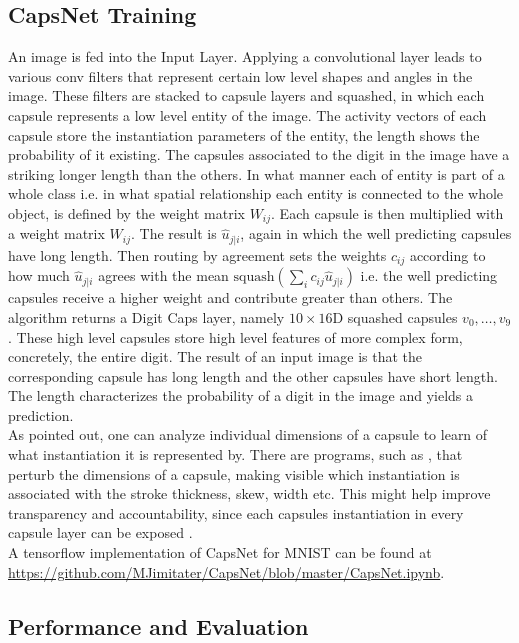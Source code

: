 \documentclass{article}
\begin{document}
{\subsection{CapsNet Training}

An image is fed into the Input Layer. Applying a convolutional layer leads to various conv filters that represent certain low level shapes and angles in the image. These filters are stacked to capsule layers and squashed, in which each capsule represents a low level entity of the image. The activity vectors of each capsule store the instantiation parameters of the entity, the length shows the probability of it existing. The capsules associated to the digit in the image have a striking longer length than the others. In what manner each of entity is part of a whole class i.e. in what spatial relationship each entity is connected to the whole object, is defined by the weight matrix $W_{ij}$. Each capsule is then multiplied with a weight matrix $W_{ij}$. The result is $\hat{u}_{j|i}$, again in which the well predicting capsules have long length. Then routing by agreement sets the weights $c_{ij}$ according to how much $\hat{u}_{j|i}$ agrees with the mean $ \text{squash}(\sum_i c_{ij} \hat{u}_{j|i})$ i.e. the well predicting capsules receive a higher weight and contribute greater than others. The algorithm returns a Digit Caps layer, namely $10 \times 16$D squashed capsules $v_0, \ldots , v_9$. These high level capsules store high level features of more complex form, concretely, the entire digit. The result of an input image is that the corresponding capsule has long length and the other capsules have short length. The length characterizes the probability of a digit in the image and yields a prediction.\\
As \cite{hinton17} pointed out, one can analyze individual dimensions of a capsule to learn of what instantiation it is represented by. There are programs, such as \cite{capsule_perturbation}, that perturb the dimensions of a capsule, making visible which instantiation is associated with the stroke thickness, skew, width etc. This might help improve transparency and accountability, since each capsules instantiation in every capsule layer can be exposed \cite{explainability}.\\
A tensorflow implementation of CapsNet for MNIST can be found at
\url{https://github.com/MJimitater/CapsNet/blob/master/CapsNet.ipynb}.

\subsection{Performance and Evaluation}

}
\end{document}
